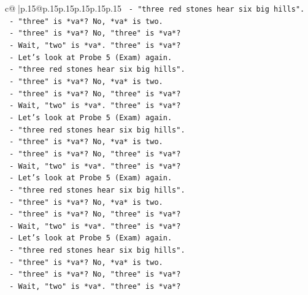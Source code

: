 \documentclass{article}
\begin{document}
{\begin{supertabular}{c@{$\;$}|p{.15\linewidth}@{}p{.15\linewidth}p{.15\linewidth}p{.15\linewidth}p{.15\linewidth}p{.15\linewidth}}
{{{\texttt{                {-} "three red stones hear six big hills".} \\
\texttt{                {-} "three" is *va*? No, *va* is two.} \\
\texttt{                {-} "three" is *va*? No, "three" is *va*?} \\
\texttt{                {-} Wait, "two" is *va*. "three" is *va*?} \\
\texttt{                {-} Let's look at Probe 5 (Exam) again.} \\
\texttt{                {-} "three red stones hear six big hills".} \\
\texttt{                {-} "three" is *va*? No, *va* is two.} \\
\texttt{                {-} "three" is *va*? No, "three" is *va*?} \\
\texttt{                {-} Wait, "two" is *va*. "three" is *va*?} \\
\texttt{                {-} Let's look at Probe 5 (Exam) again.} \\
\texttt{                {-} "three red stones hear six big hills".} \\
\texttt{                {-} "three" is *va*? No, *va* is two.} \\
\texttt{                {-} "three" is *va*? No, "three" is *va*?} \\
\texttt{                {-} Wait, "two" is *va*. "three" is *va*?} \\
\texttt{                {-} Let's look at Probe 5 (Exam) again.} \\
\texttt{                {-} "three red stones hear six big hills".} \\
\texttt{                {-} "three" is *va*? No, *va* is two.} \\
\texttt{                {-} "three" is *va*? No, "three" is *va*?} \\
\texttt{                {-} Wait, "two" is *va*. "three" is *va*?} \\
\texttt{                {-} Let's look at Probe 5 (Exam) again.} \\
\texttt{                {-} "three red stones hear six big hills".} \\
\texttt{                {-} "three" is *va*? No, *va* is two.} \\
\texttt{                {-} "three" is *va*? No, "three" is *va*?} \\
\texttt{                {-} Wait, "two" is *va*. "three" is *va*?} \\
}}}
\end{supertabular}}
\end{document}
